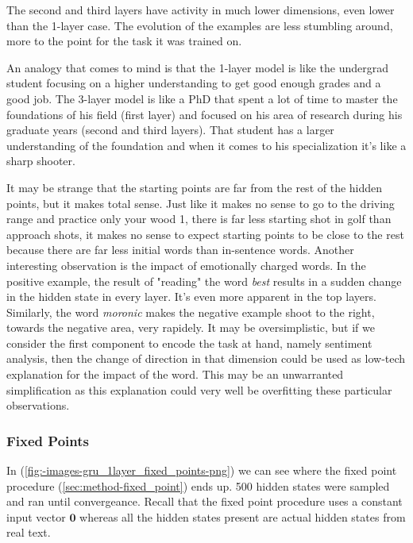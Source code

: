 \documentclass{article}
\begin{document}
The second and third layers have activity in much lower dimensions, even lower than the 1-layer case. The evolution of the examples are less stumbling around, more to the point for the task it was trained on. 

An analogy that comes to mind is that the 1-layer model is like the undergrad student focusing on a higher understanding to get good enough grades and a good job. The 3-layer model is like a PhD that spent a lot of time to master the foundations of his field (first layer) and focused on his area of research during his graduate years (second and third layers). That student has a larger understanding of the foundation and when it comes to his specialization it's like a sharp shooter. 

It may be strange that the starting points are far from the rest of the hidden points, but it makes total sense. Just like it makes no sense to go to the driving range and practice only your wood 1, there is far less starting shot in golf than approach shots, it makes no sense to expect starting points to be close to the rest because there are far less initial words than in-sentence words. Another interesting observation is the impact of emotionally charged words. In the positive example, the result of "reading" the word \textit{best} results in a sudden change in the hidden state in every layer. It's even more apparent in the top layers. Similarly, the word \textit{moronic} makes the negative example shoot to the right, towards the negative area, very rapidely. It may be oversimplistic, but if we consider the first component to encode the task at hand, namely sentiment analysis, then the change of direction in that dimension could be used as low-tech explanation for the impact of the word. This may be an unwarranted simplification as this explanation could very well be overfitting these particular observations.

\subsubsection{Fixed Points}
\label{subsec:fixed-points}

In (\ref{fig:-images-gru_1layer_fixed_points-png}) we can see where the fixed point procedure (\ref{sec:method-fixed_point}) ends up. 500 hidden states were sampled and ran until convergeance. Recall that the fixed point procedure uses a constant input vector $\textbf{0}$ whereas all the hidden states present are actual hidden states from real text.
\end{document}
